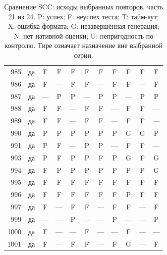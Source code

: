 \begin{table}[p]
\begin{tabular*}{\textwidth}{@{\extracolsep{\fill}}rc*{9}{c}@{}}
985 & да & F & F & F & F & F & F & F & F & F\\
986 & да & F & — & F & F & — & F & F & — & F\\
987 & да & — & P & P & — & P & P & — & P & P\\
988 & да & F & F & — & F & F & — & F & F & —\\
989 & да & F & F & — & F & F & — & F & F & —\\
990 & да & P & P & P & P & P & P & G & G & P\\
991 & да & P & F & — & P & P & — & F & F & —\\
993 & да & P & F & P & P & F & P & G & F & G\\
994 & да & F & P & P & P & P & P & P & P & G\\
995 & да & F & F & F & F & F & F & F & F & F\\
996 & да & F & F & F & F & F & F & P & F & F\\
997 & да & F & — & F & F & — & F & F & — & F\\
999 & да & — & — & P & — & — & P & — & — & P\\
1000 & да & F & — & — & F & — & — & F & — & —\\
1001 & да & F & — & F & F & — & F & G & — & F\\
\bottomrule\end{tabular*}
\caption{Сравнение SCC: исходы выбранных повторов, часть 21 из 24. P: успех; F: неуспех теста; T: тайм-аут; X: ошибка формата; G: незавершённая генерация; N: нет нативной оценки; U: непригодность по контролю. Тире означает назначение вне выбранной серии.}
\end{table}
\clearpage
